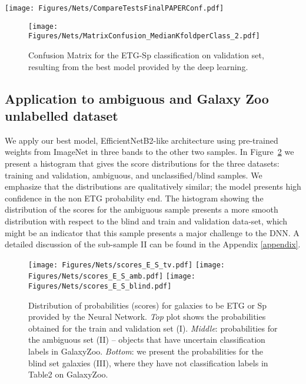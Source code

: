 \documentclass[fleqn,usenatbib]{mnras}
\begin{document}
\begin{figure*}
\centering
\texttt{[image: Figures/Nets/CompareTestsFinalPAPERConf.pdf]}
    \caption{
    \label{fig:MC_EfficientNetB2_2}
    Results for A and D with the 3-, 8-band models, respectively. Model B used pre-trained ImageNet weights initialization with $3$ bands. The shaded regions represents the standard deviation in the folds. The upper panel presents the Receiver Operating Characteristic curve (ROC) where TPR is the True Positive rate (completeness or recall) and FPR is the false positive rate. The lower panels presents the Precision (purity) and Recall (completeness).
    }
\end{figure*}


\begin{figure}
\centering
\texttt{[image: Figures/Nets/MatrixConfusion\_MedianKfoldperClass\_2.pdf]}
    \caption{Confusion Matrix for the ETG-Sp classification on validation set, resulting from the best model provided by the deep learning.}
    \label{fig:MC_EfficientNetB2}
\end{figure}

\subsection{Application to ambiguous and Galaxy Zoo unlabelled dataset}

We apply our best model, EfficientNetB2-like architecture using pre-trained weights from ImageNet in three bands to the other two samples.
In Figure~\ref{fig:scores_probs} we present a histogram that gives the score distributions for the three datasets: training and validation, ambiguous, and unclassified/blind samples. We emphasize that the distributions are qualitatively similar; the model presents high confidence in the non ETG probability end. 
The histogram showing the distribution of the scores for the ambiguous sample presents a more smooth distribution with respect to the blind and train and validation data-set, which might be an indicator that this sample presents a major challenge to the DNN. A detailed discussion of the sub-sample II can be found in the Appendix \ref{appendix}.


\begin{figure}
\centering
\texttt{[image: Figures/Nets/scores\_E\_S\_tv.pdf]}
\texttt{[image: Figures/Nets/scores\_E\_S\_amb.pdf]}
\texttt{[image: Figures/Nets/scores\_E\_S\_blind.pdf]}
    \caption{
    Distribution of probabilities (scores) for galaxies to be ETG or Sp provided by the Neural Network.
    \emph{Top} plot shows the probabilities obtained for the train and validation set (I). \emph{Middle}: probabilities for the ambiguous set (II) -- objects that have uncertain classification labels in GalaxyZoo.
    \emph{Bottom}: we present the probabilities for the blind set galaxies (III), where they have not classification labels in Table2 on GalaxyZoo.
    \label{fig:scores_probs}}
\end{figure}
\end{document}
